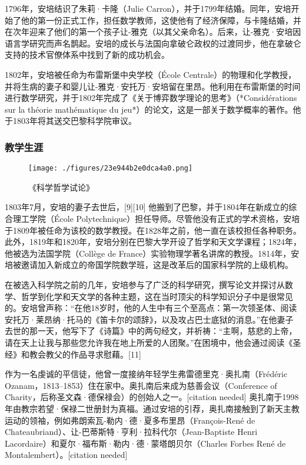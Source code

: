 1796年，安培结识了朱莉·卡隆（Julie Carron），并于1799年结婚。同年，安培开始了他的第一份正式工作，担任数学教师，这使他有了经济保障，与卡隆结婚，并在次年迎来了他们的第一个孩子让-雅克（以其父亲命名）。后来，让-雅克·安培因语言学研究而声名鹊起。安培的成长与法国向拿破仑政权的过渡同步，他在拿破仑支持的技术官僚体系中找到了新的成功机会。

1802年，安培被任命为布雷斯堡中央学校（École Centrale）的物理和化学教授，并将生病的妻子和婴儿让-雅克·安托万·安培留在里昂。他利用在布雷斯堡的时间进行数学研究，并于1802年完成了《关于博弈数学理论的思考》（*Considérations sur la théorie mathématique du jeu*）的论文，这是一部关于数学概率的著作。他于1803年将其送交巴黎科学院审议。
\subsubsection{教学生涯}
\begin{figure}[ht]
\centering
\texttt{[image: ./figures/23e944b2e0dca4a0.png]}
\caption{《科学哲学试论》} \label{fig_AP_1}
\end{figure}
1803年7月，安培的妻子去世后，[9][10] 他搬到了巴黎，并于1804年在新成立的综合理工学院（École Polytechnique）担任导师。尽管他没有正式的学术资格，安培于1809年被任命为该校的数学教授。在1828年之前，他一直在该校担任各种职务。此外，1819年和1820年，安培分别在巴黎大学开设了哲学和天文学课程；1824年，他被选为法国学院（Collège de France）实验物理学著名讲席的教授。1814年，安培被邀请加入新成立的帝国学院数学班，这是改革后的国家科学院的上级机构。

在被选入科学院之前的几年，安培参与了广泛的科学研究，撰写论文并探讨从数学、哲学到化学和天文学的各种主题，这在当时顶尖的科学知识分子中是很常见的。安培曾声称：“在他18岁时，他的人生中有三个至高点：第一次领圣体、阅读安托万·莱昂纳·托马的《笛卡尔的颂辞》，以及攻占巴士底狱的消息。”在他妻子去世的那一天，他写下了《诗篇》中的两句经文，并祈祷：“主啊，慈悲的上帝，请在天上让我与那些您允许我在地上所爱的人团聚。”在困境中，他会通过阅读《圣经》和教会教父的作品寻求慰藉。[11]

作为一名虔诚的平信徒，他曾一度接纳年轻学生弗雷德里克·奥扎南（Frédéric Ozanam，1813–1853）住在家中。奥扎南后来成为慈善会议（Conference of Charity，后称圣文森·德保禄会）的创始人之一。[citation needed] 奥扎南于1998年由教宗若望·保禄二世册封为真福。通过安培的引荐，奥扎南接触到了新天主教运动的领袖，例如弗朗索瓦-勒内·德·夏多布里昂（François-René de Chateaubriand）、让-巴蒂斯特·亨利·拉科代尔（Jean-Baptiste Henri Lacordaire）和夏尔·福布斯·勒内·德·蒙塔朗贝尔（Charles Forbes René de Montalembert）。[citation needed]
